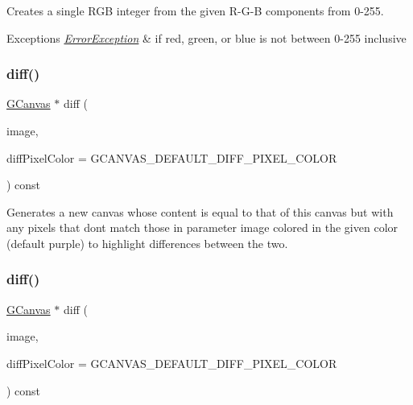 Creates a single R\+GB integer from the given R-\/\+G-\/B components from 0-\/255. 


\begin{DoxyExceptions}{Exceptions}
{\em \mbox{\hyperlink{classErrorException}{Error\+Exception}}} & if red, green, or blue is not between 0-\/255 inclusive \\
\hline
\end{DoxyExceptions}
\mbox{\label{classGCanvas_aa4e74e40eebb70c9616065056de5c4ca}} 
\subsubsection{\texorpdfstring{diff()}{diff()}\hspace{0.1cm}{\footnotesize\ttfamily [1/2]}}
{\footnotesize\ttfamily \mbox{\hyperlink{classGCanvas}{G\+Canvas}} $\ast$ diff (\begin{DoxyParamCaption}\item[{const \mbox{\hyperlink{classGCanvas}{G\+Canvas}} \&}]{image,  }\item[{int}]{diff\+Pixel\+Color = {\ttfamily GCANVAS\+\_\+DEFAULT\+\_\+DIFF\+\_\+PIXEL\+\_\+COLOR} }\end{DoxyParamCaption}) const\hspace{0.3cm}{\ttfamily [virtual]}}



Generates a new canvas whose content is equal to that of this canvas but with any pixels that don\textquotesingle{}t match those in parameter \textquotesingle{}image\textquotesingle{} colored in the given color (default purple) to highlight differences between the two. 

\mbox{\label{classGCanvas_a5385d5c8fda55dfe0b20851d293b338b}} 
\subsubsection{\texorpdfstring{diff()}{diff()}\hspace{0.1cm}{\footnotesize\ttfamily [2/2]}}
{\footnotesize\ttfamily \mbox{\hyperlink{classGCanvas}{G\+Canvas}} $\ast$ diff (\begin{DoxyParamCaption}\item[{const \mbox{\hyperlink{classGCanvas}{G\+Canvas}} $\ast$}]{image,  }\item[{int}]{diff\+Pixel\+Color = {\ttfamily GCANVAS\+\_\+DEFAULT\+\_\+DIFF\+\_\+PIXEL\+\_\+COLOR} }\end{DoxyParamCaption}) const\hspace{0.3cm}{\ttfamily [virtual]}}



